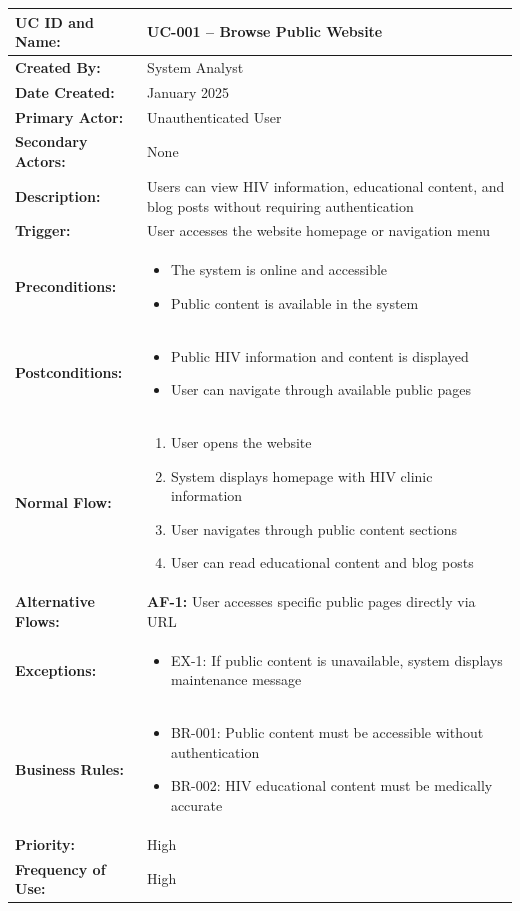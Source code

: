 \documentclass[12pt,a4paper]{article}
\begin{document}
\renewcommand{\arraystretch}{1.5}
\begin{longtable}{|p{4.5cm}|p{10.5cm}|}
\hline
\textbf{UC ID and Name:} & UC-001 – Browse Public Website \\
\hline
\textbf{Created By:} & System Analyst \\
\hline
\textbf{Date Created:} & January 2025 \\
\hline
\textbf{Primary Actor:} & Unauthenticated User \\
\hline
\textbf{Secondary Actors:} & None \\
\hline
\textbf{Description:} & Users can view HIV information, educational content, and blog posts without requiring authentication \\
\hline
\textbf{Trigger:} & User accesses the website homepage or navigation menu \\
\hline
\textbf{Preconditions:} &
\begin{itemize}
  \item The system is online and accessible
  \item Public content is available in the system
\end{itemize} \\
\hline
\textbf{Postconditions:} &
\begin{itemize}
  \item Public HIV information and content is displayed
  \item User can navigate through available public pages
\end{itemize} \\
\hline
\textbf{Normal Flow:} &
\begin{enumerate}
  \item User opens the website
  \item System displays homepage with HIV clinic information
  \item User navigates through public content sections
  \item User can read educational content and blog posts
\end{enumerate} \\
\hline
\textbf{Alternative Flows:} & 
\textbf{AF-1:} User accesses specific public pages directly via URL \\
\hline
\textbf{Exceptions:} &
\begin{itemize}
  \item EX-1: If public content is unavailable, system displays maintenance message
\end{itemize} \\
\hline
\textbf{Business Rules:} &
\begin{itemize}
  \item BR-001: Public content must be accessible without authentication
  \item BR-002: HIV educational content must be medically accurate
\end{itemize} \\
\hline
\textbf{Priority:} & High \\
\hline
\textbf{Frequency of Use:} & High \\
\hline
\end{longtable}
\end{document}
